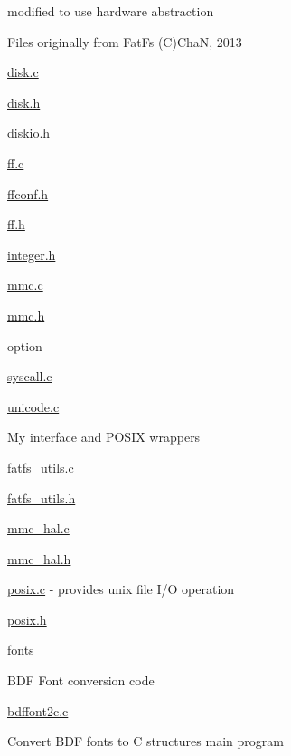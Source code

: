 \begin{DoxyItemize}
\begin{DoxyItemize}
\begin{DoxyItemize}
\item modified to use hardware abstraction
\end{DoxyItemize}
\item Files originally from Fat\-Fs (C)Cha\-N, 2013
\begin{DoxyItemize}
\item \hyperlink{disk_8c}{disk.\-c}
\item \hyperlink{disk_8h}{disk.\-h}
\item \hyperlink{diskio_8h}{diskio.\-h}
\item \hyperlink{ff_8c}{ff.\-c}
\item \hyperlink{ffconf_8h}{ffconf.\-h}
\item \hyperlink{ff_8h}{ff.\-h}
\item \hyperlink{integer_8h}{integer.\-h}
\item \hyperlink{mmc_8c}{mmc.\-c}
\item \hyperlink{mmc_8h}{mmc.\-h}
\item option
\item \hyperlink{syscall_8c}{syscall.\-c}
\item \hyperlink{unicode_8c}{unicode.\-c}
\end{DoxyItemize}
\item My interface and P\-O\-S\-I\-X wrappers
\begin{DoxyItemize}
\item \hyperlink{fatfs__utils_8c}{fatfs\-\_\-utils.\-c}
\item \hyperlink{fatfs__utils_8h}{fatfs\-\_\-utils.\-h}
\item \hyperlink{mmc__hal_8c}{mmc\-\_\-hal.\-c}
\item \hyperlink{mmc__hal_8h}{mmc\-\_\-hal.\-h}
\item \hyperlink{posix_8c}{posix.\-c} -\/ provides unix file I/\-O operation
\item \hyperlink{posix_8h}{posix.\-h}
\end{DoxyItemize}
\end{DoxyItemize}
\item fonts
\begin{DoxyItemize}
\item B\-D\-F Font conversion code
\begin{DoxyItemize}
\item \hyperlink{bdffont2c_8c}{bdffont2c.\-c}
\begin{DoxyItemize}
\item Convert B\-D\-F fonts to C structures main program

\end{DoxyItemize}
\end{DoxyItemize}
\end{DoxyItemize}
\end{DoxyItemize}
